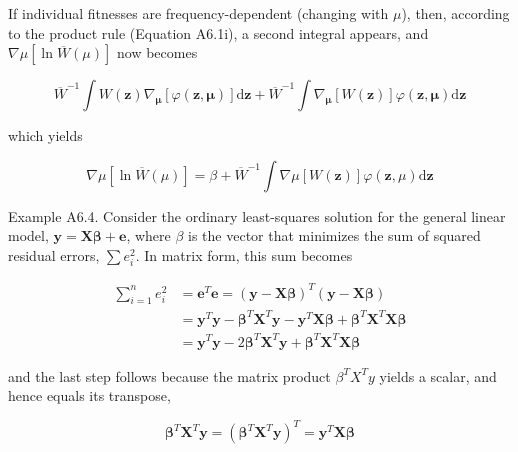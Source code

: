 \documentclass{article}
\begin{document}
If individual fitnesses are frequency-dependent (changing with  $ \mu $), then, according to the product rule (Equation A6.1i), a second integral appears, and  $ \nabla \mu \left[ \ln \overline{W}(\mu) \right] $ now becomes

\begin{equation}
\overline{W}^{-1}\int W(\mathbf{z})\nabla_{\boldsymbol{\mu}}\left[\varphi(\mathbf{z},\boldsymbol{\mu})\right]\mathrm{d}\mathbf{z}+\overline{W}^{-1}\int\nabla_{\boldsymbol{\mu}}\left[W(\mathbf{z})\right]\varphi(\mathbf{z},\boldsymbol{\mu})\mathrm{d}\mathbf{z}
\end{equation}

which yields

\begin{equation}
\nabla\mu[\ln\overline{W}(\mu)]=\beta+\overline{W}^{-1}\int\nabla\mu\left[W(\mathbf{z})\right]\varphi(\mathbf{z},\mu)\mathrm{d}\mathbf{z}
\end{equation}

Example A6.4. Consider the ordinary least-squares solution for the general linear model,  $ \mathbf{y} = \mathbf{X} \boldsymbol{\beta} + \mathbf{e} $, where  $ \beta $ is the vector that minimizes the sum of squared residual errors,  $ \sum e_i^2 $. In matrix form, this sum becomes

\begin{equation}
\begin{aligned}\sum_{i=1}^{n}e_{i}^{2}&=\mathbf{e}^{T}\mathbf{e}=(\mathbf{y}-\mathbf{X}\boldsymbol{\beta})^{T}(\mathbf{y}-\mathbf{X}\boldsymbol{\beta})\\&=\mathbf{y}^{T}\mathbf{y}-\boldsymbol{\beta}^{T}\mathbf{X}^{T}\mathbf{y}-\mathbf{y}^{T}\mathbf{X}\boldsymbol{\beta}+\boldsymbol{\beta}^{T}\mathbf{X}^{T}\mathbf{X}\boldsymbol{\beta}\\&=\mathbf{y}^{T}\mathbf{y}-2\boldsymbol{\beta}^{T}\mathbf{X}^{T}\mathbf{y}+\boldsymbol{\beta}^{T}\mathbf{X}^{T}\mathbf{X}\boldsymbol{\beta}\end{aligned}
\end{equation}

and the last step follows because the matrix product  $ \beta^{T} X^{T} y $ yields a scalar, and hence equals its transpose,

\begin{equation}
\boldsymbol{\beta}^{T}\mathbf{X}^{T}\mathbf{y}=\left(\boldsymbol{\beta}^{T}\mathbf{X}^{T}\mathbf{y}\right)^{T}=\mathbf{y}^{T}\mathbf{X}\boldsymbol{\beta}
\end{equation}
\end{document}
